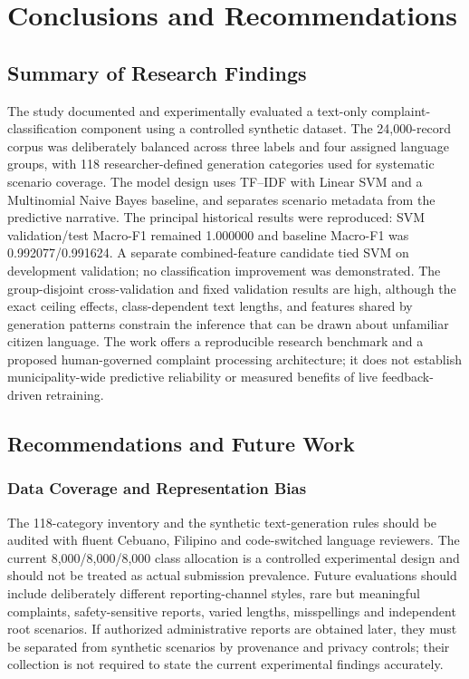 \chapter{Conclusions and Recommendations}
\section{Summary of Research Findings}
The study documented and experimentally evaluated a text-only complaint-classification component using a controlled synthetic dataset. The 24,000-record corpus was deliberately balanced across three labels and four assigned language groups, with 118 researcher-defined generation categories used for systematic scenario coverage. The model design uses TF--IDF with Linear SVM and a Multinomial Naive Bayes baseline, and separates scenario metadata from the predictive narrative. The principal historical results were reproduced: SVM validation/test Macro-F1 remained 1.000000 and baseline Macro-F1 was 0.992077/0.991624. A separate combined-feature candidate tied SVM on development validation; no classification improvement was demonstrated. The group-disjoint cross-validation and fixed validation results are high, although the exact ceiling effects, class-dependent text lengths, and features shared by generation patterns constrain the inference that can be drawn about unfamiliar citizen language. The work offers a reproducible research benchmark and a proposed human-governed complaint processing architecture; it does not establish municipality-wide predictive reliability or measured benefits of live feedback-driven retraining.

\section{Recommendations and Future Work}
\subsection{Data Coverage and Representation Bias}
The 118-category inventory and the synthetic text-generation rules should be audited with fluent Cebuano, Filipino and code-switched language reviewers. The current 8,000/8,000/8,000 class allocation is a controlled experimental design and should not be treated as actual submission prevalence. Future evaluations should include deliberately different reporting-channel styles, rare but meaningful complaints, safety-sensitive reports, varied lengths, misspellings and independent root scenarios. If authorized administrative reports are obtained later, they must be separated from synthetic scenarios by provenance and privacy controls; their collection is not required to state the current experimental findings accurately.

